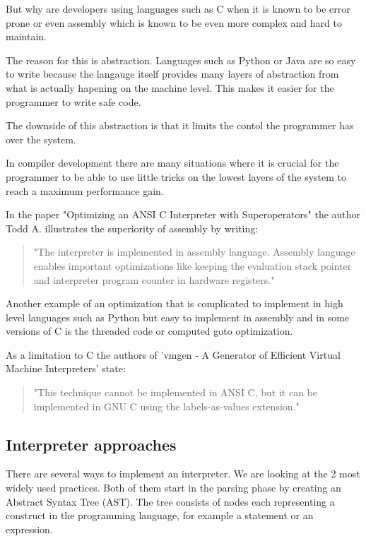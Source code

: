 \documentclass{article}
\begin{document}
But why are developers using languages such as C when it is known to be error
prone or even assembly which is known to be even more complex and hard to
maintain.

The reason for this is abstraction. Languages such as Python or Java are so
easy to write because the langauge itself provides many layers of abstraction
from what is actually hapening on the machine level. This makes it easier for
the programmer to write safe code. 

The downside of this abstraction is that it limits the contol the programmer
has over the system.

In compiler development there are many situations where it is crucial for the
programmer to be able to use little tricks on the lowest layers of the system
to reach a maximum performance gain.

In the paper "Optimizing an ANSI C Interpreter with Superoperators" the author
Todd A. illustrates the superiority of assembly by writing:

\begin{quotation}
"The interpreter is implemented in assembly language.
Assembly language enables important optimizations like keeping the evaluation
stack pointer and interpreter program counter in hardware registers." ~\cite{superoperators}
\end{quotation}

Another example of an optimization that is complicated to implement in high
level languages such as Python but easy to implement in assembly and in some
versions of C is the threaded code or computed goto optimization.

As a limitation to C the authors of 'vmgen - A Generator of Efficient Virtual
Machine Interpreters' state:
\begin{quotation} 
"This technique cannot be implemented in ANSI C, but it can be implemented in
GNU C using the labels-as-values extension." ~\cite{vmgen} 
\end{quotation}

\subsection{Interpreter approaches}
There are several ways to implement an interpreter. We are looking
at the 2 most widely used practices. 
Both of them start in the parsing phase by creating an Abstract Syntax
Tree (AST). The tree consists of nodes each representing a construct in
the programming language, for example a statement or an expression.
\end{document}
